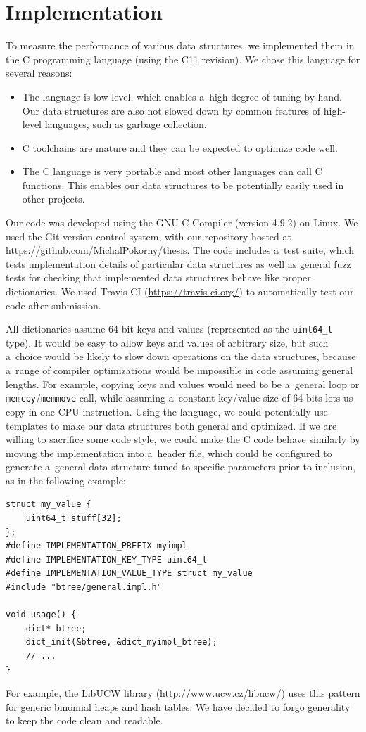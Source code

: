 \chapter{Implementation}
\label{chapter:implementation}
To measure the performance of various data structures, we implemented them
in the C programming language (using the C11 revision).
We chose this language for several reasons:
\begin{itemize}
\item The language is low-level, which enables a~high degree of tuning by hand.
	Our data structures are also not slowed down by common features of
	high-level languages, such as garbage collection.
\item C toolchains are mature and they can be expected to optimize code well.
\item The C language is very portable and most other languages can
	call C functions. This enables our data structures to be potentially
	easily used in other projects.
\end{itemize}

Our code was developed using the GNU C Compiler (version 4.9.2) on Linux.
We used the Git version control system, with our repository hosted at
\url{https://github.com/MichalPokorny/thesis}. The code includes a~test suite,
which tests implementation details of particular data structures as well
as general fuzz tests for checking that implemented data structures behave
like proper dictionaries. We used Travis CI (\url{https://travis-ci.org/})
to automatically test our code after submission.

All dictionaries assume 64-bit keys and values (represented as the
\texttt{uint64\_t} type). It would be easy to allow keys and values of arbitrary
size, but such a~choice would be likely to slow down operations on
the data structures, because a~range of compiler optimizations would
be impossible in code assuming general lengths. For example, copying
keys and values would need to be a~general loop or
\texttt{memcpy}/\texttt{memmove} call, while assuming a~constant key/value
size of 64 bits lets us copy in one CPU instruction. Using the \Cpp language,
we could potentially use templates to make our data structures both general
and optimized. If we are willing to sacrifice some code style, we could
make the C code behave similarly by moving the implementation into a~header
file, which could be configured to generate a~general data structure
tuned to specific parameters prior to inclusion, as in the following example:
\begin{lstlisting}
struct my_value {
	uint64_t stuff[32];
};
#define IMPLEMENTATION_PREFIX myimpl
#define IMPLEMENTATION_KEY_TYPE uint64_t
#define IMPLEMENTATION_VALUE_TYPE struct my_value
#include "btree/general.impl.h"

void usage() {
	dict* btree;
	dict_init(&btree, &dict_myimpl_btree);
	// ...
}
\end{lstlisting}
For example, the LibUCW library (\url{http://www.ucw.cz/libucw/})
uses this pattern for generic binomial heaps and hash tables.
We have decided to forgo generality to keep the code clean and readable.

